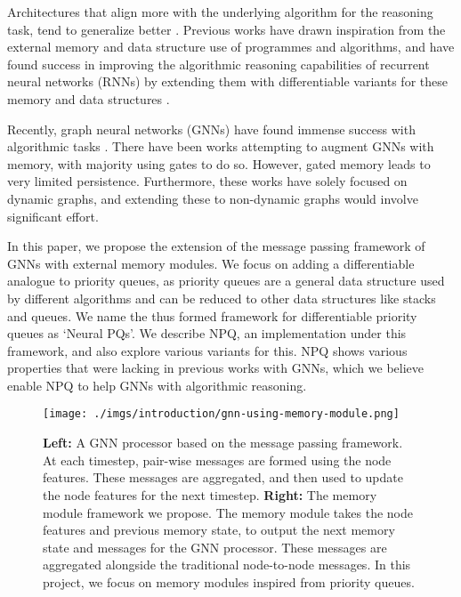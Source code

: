 \documentclass{article}
\theoremstyle{plain}
\theoremstyle{definition}
\theoremstyle{remark}
\begin{document}
Architectures that align more with the underlying algorithm for the reasoning task, tend to generalize better \citep{Xu-Neural-Networks-Reasoning}.
Previous works have drawn inspiration from the external memory and data structure use of programmes and algorithms, and have found success in improving
the algorithmic reasoning capabilities of recurrent neural networks (RNNs) by extending them with differentiable variants for these memory
and data structures \citep{Graves-NTM,Grefenstette-neural-queue}.

Recently, graph neural networks (GNNs) have found immense success with algorithmic tasks \citep{Chen-GNNs-Substructure-count,Velickovic-CLRS}.
There have been works attempting to augment GNNs with memory, with majority using gates to do so. However, gated memory leads to very limited
persistence. Furthermore, these works have solely focused on dynamic graphs,
and extending these to non-dynamic graphs would involve significant effort. 

In this paper, we propose the extension of the message passing framework of GNNs with external memory modules.
We focus on adding a differentiable analogue to priority queues, as priority queues are a general data structure used by different algorithms and
can be reduced to other data structures like stacks and queues. We name the thus formed framework for differentiable priority queues as `Neural PQs'.
We describe NPQ, an implementation under this framework, and also explore various variants for this.
NPQ shows various properties that were lacking in previous works with GNNs, which we believe enable NPQ to help GNNs with algorithmic reasoning.

\begin{figure}[tb]
    \centering
    \texttt{[image: ./imgs/introduction/gnn-using-memory-module.png]}
    \caption[Proposed extension of message-passing framework with external memory modules]{\textbf{Left:} A GNN processor based on the message passing framework. At each timestep,
             pair-wise messages are formed using the node features.
             These messages are aggregated, and then used to update the node features for the next timestep. \textbf{Right:} The memory module framework we propose.
             The memory module takes the node features and previous memory state, to output the next memory state and messages for the GNN processor.
             These messages are aggregated alongside the traditional node-to-node messages. In this project, we focus on memory modules inspired from priority queues.}
    \label{fig:gnn-using-memory-modules}
\end{figure}
\end{document}
